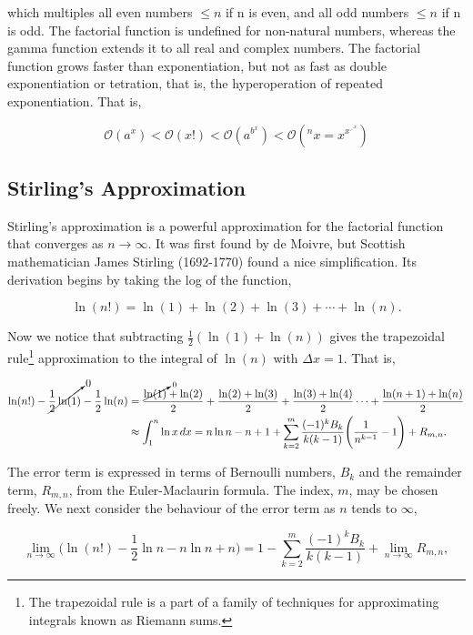 \documentclass[11pt]{amsart}
\begin{document}
which multiples all even numbers $\leq n$ if n is even, and all odd numbers $\leq n$ if n is odd.  The factorial function is undefined for non-natural numbers, whereas the gamma function extends it to all real and complex numbers. The factorial function grows faster than exponentiation, but not as fast as double exponentiation or tetration, that is, the hyperoperation of repeated exponentiation. That is,

$$\mathcal{O}(a^x) < \mathcal{O}(x!) < \mathcal{O}(a^{b^x}) < \mathcal{O}(^nx = x^{x^{\iddots^{x}}})$$

\subsection{Stirling's Approximation}

Stirling's approximation is a powerful approximation for the factorial function that converges as $n \to \infty$. It was first found by de Moivre, but Scottish mathematician James Stirling (1692-1770) found a nice simplification. Its derivation begins by taking the log of the function,

$$\ln(n!) = \ln(1) + \ln(2) + \ln(3) + \cdots + \ln(n).$$

Now we notice that subtracting $\frac{1}{2}(\ln(1) + \ln(n))$ gives the trapezoidal rule\footnote{The trapezoidal rule is a part of a family of techniques for approximating integrals known as Riemann sums.} approximation to the integral of $\ln(n)$ with $\Delta x = 1$. That is,

\begin{align}
\ln(n!) - \cancelto{0}{\frac{1}{2}\ln(1)} - \frac{1}{2}\ln(n) &= \frac{\cancelto{0}{\ln(1)} + \ln(2)}{2} + \frac{\ln(2) + \ln(3)}{2} + \frac{\ln(3) + \ln(4)}{2} \cdots + \frac{\ln(n + 1) + \ln(n)}{2} \notag \\
&\approx \int_{1}^{n} \ln{x} \mathop{dx} = n\ln n - n + 1 + \sum_{k=2}^{m} \frac{(-1)^kB_k}{k(k-1)}\Bigg(\frac{1}{n^{k-1}} - 1\Bigg) + R_{m,n}. \notag
\end{align}

The error term is expressed in terms of Bernoulli numbers, $B_k$ and the remainder term, $R_{m,n}$, from the Euler-Maclaurin formula. The index, $m$, may be chosen freely. We next consider the behaviour of the error term as $n$ tends to $\infty$,

$$\lim_{n \to \infty}\Big(\ln(n!) - \frac{1}{2}\ln n - n\ln n + n\Big) = 1 - \sum_{k=2}^{m} \frac{(-1)^kB_k}{k(k-1)} + \lim_{n \to \infty}R_{m,n},$$
\end{document}

